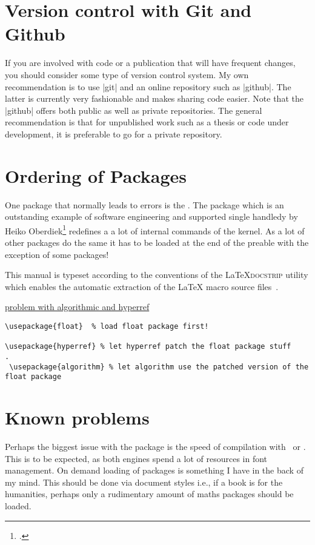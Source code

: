  \section{Version control with Git and Github}
 
 If you are involved with code or a publication that will have frequent changes, you should consider
 some type of version control system. My own recommendation is to use |git| and an online repository such
 as |github|. The latter is currently very fashionable and makes sharing code easier. Note that the |github|
 offers both public as well as private repositories. The general recommendation is that for unpublished work
 such as a thesis or code under development, it is preferable to go for a private repository. 
 
 \lorem\lorem

 \section{Ordering of Packages}
 
One package that normally leads to errors is the 
. The package which is an outstanding example of software engineering and supported single handledy by Heiko Oberdiek\footcite{hyperref} redefines a a lot of internal commands of the kernel. As a lot of other packages do the same it has to be loaded at the end of the preable with the exception of some packages! 
 
 This manual is typeset according to the conventions of the
 \LaTeX \textsc{docstrip} utility which enables the automatic
 extraction of the \LaTeX{} macro source files~\cite{GOOSSENS94}.

 
 \href{http://tex.stackexchange.com/questions/96350/problem-with-algorithmic-and-hyperref}{problem with algorithmic and hyperref}

 \begin{verbatim}
\usepackage{float}  % load float package first!

\usepackage{hyperref} % let hyperref patch the float package stuff
.
 \usepackage{algorithm} % let algorithm use the patched version of the float package
 \end{verbatim}
 

\section{Known problems}

Perhaps the biggest issue with the package is the speed of
compilation with \XeLaTeX\ or \LuaTeX. This is to be expected, as both engines spend a lot of resources in font management. On demand loading of packages is something I have in the back of my mind. This should be done via document styles i.e., if a book is for the humanities, perhaps only a rudimentary amount of maths packages should be loaded.

